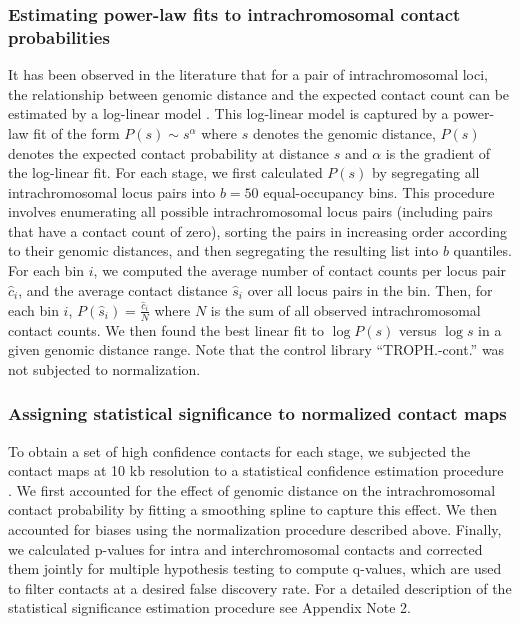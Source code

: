 \subsubsection{Estimating power-law fits to intrachromosomal contact probabilities}
\label{met:power-law}
It has been observed in the literature that for a pair of intrachromosomal loci,
the relationship between genomic distance and the expected contact count can be
estimated by a log-linear model \citep{lieberman-aiden:comprehensive, fudenberg:higher-order}.
This log-linear model is captured by a power-law fit of the form $P(s) \sim s^\alpha$
where $s$ denotes the genomic distance, $P(s)$ denotes the expected contact
probability at distance $s$ and $\alpha$ is the gradient of the log-linear fit.
For each stage, we first calculated $P(s)$ by segregating all intrachromosomal locus
pairs into $b=50$ equal-occupancy bins. This procedure involves enumerating all
possible intrachromosomal locus pairs (including pairs that have a contact count of zero),
sorting the pairs in increasing order according to their genomic distances, and then
segregating the resulting list into $b$ quantiles. For each bin $i$, we computed the
average number of contact counts per locus pair $\hat{c}_i$, and the average contact
distance $\hat{s}_i$ over all locus pairs in the bin. Then, for each bin $i$,
$P(\hat{s}_i)= \frac{\hat{c}_i}{N}$ where $N$ is the sum of all observed intrachromosomal
contact counts. We then found the best linear fit to $\log P(s)$ versus $\log s$ in
a given genomic distance range. Note that the control library  ``TROPH.-cont.''
was not subjected to normalization.


\subsubsection{Assigning statistical significance to normalized contact maps}
\label{met:fithic}
To obtain a set of high confidence contacts for each stage, we subjected the contact
maps at 10 kb resolution to a statistical confidence estimation procedure
\citep{ay:statistical}. We first accounted for the effect of genomic distance on the
intrachromosomal contact probability by fitting a smoothing spline to capture this
effect. We then accounted for biases using the normalization procedure described
above. Finally, we calculated p-values for intra and interchromosomal contacts and
corrected them jointly for multiple hypothesis testing to compute q-values, which
are used to filter contacts at a desired false discovery rate. For a detailed
description of the statistical significance estimation procedure see Appendix Note 2.

